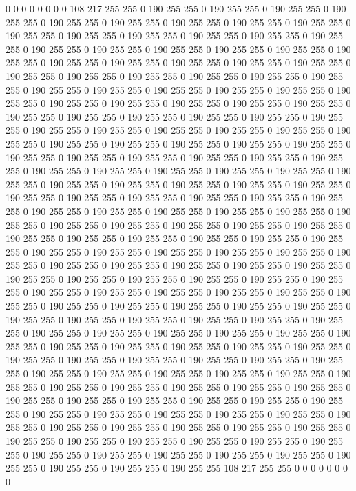 0 0 0 0 0 0 0 0 108 217 255 255 0 190 255 255 0 190 255 255 0 190 255 255 0 190 255 255 0 190 255 255 0 190 255 255 0 190 255 255 0 190 255 255 0 190 255 255 0 190 255 255 0 190 255 255 0 190 255 255 0 190 255 255 0 190 255 255 0 190 255 255 0 190 255 255 0 190 255 255 0 190 255 255 0 190 255 255 0 190 255 255 0 190 255 255 0 190 255 255 0 190 255 255 0 190 255 255 0 190 255 255 0 190 255 255 0 190 255 255 0 190 255 255 0 190 255 255 0 190 255 255 0 190 255 255 0 190 255 255 0 190 255 255 0 190 255 255 0 190 255 255 0 190 255 255 0 190 255 255 0 190 255 255 0 190 255 255 0 190 255 255 0 190 255 255 0 190 255 255 0 190 255 255 0 190 255 255 0 190 255 255 0 190 255 255 0 190 255 255 
0 190 255 255 0 190 255 255 0 190 255 255 0 190 255 255 0 190 255 255 0 190 255 255 0 190 255 255 0 190 255 255 0 190 255 255 0 190 255 255 0 190 255 255 0 190 255 255 0 190 255 255 0 190 255 255 0 190 255 255 0 190 255 255 0 190 255 255 0 190 255 255 0 190 255 255 0 190 255 255 0 190 255 255 0 190 255 255 0 190 255 255 0 190 255 255 0 190 255 255 0 190 255 255 0 190 255 255 0 190 255 255 0 190 255 255 0 190 255 255 0 190 255 255 0 190 255 255 0 190 255 255 0 190 255 255 0 190 255 255 0 190 255 255 0 190 255 255 0 190 255 255 0 190 255 255 0 190 255 255 0 190 255 255 0 190 255 255 0 190 255 255 0 190 255 255 0 190 255 255 0 190 255 255 0 190 255 255 0 190 255 255 0 190 255 255 0 190 255 255 
0 190 255 255 0 190 255 255 0 190 255 255 0 190 255 255 0 190 255 255 0 190 255 255 0 190 255 255 0 190 255 255 0 190 255 255 0 190 255 255 0 190 255 255 0 190 255 255 0 190 255 255 0 190 255 255 0 190 255 255 0 190 255 255 0 190 255 255 0 190 255 255 0 190 255 255 0 190 255 255 0 190 255 255 0 190 255 255 0 190 255 255 0 190 255 255 0 190 255 255 0 190 255 255 0 190 255 255 0 190 255 255 0 190 255 255 0 190 255 255 0 190 255 255 0 190 255 255 0 190 255 255 0 190 255 255 0 190 255 255 0 190 255 255 0 190 255 255 0 190 255 255 0 190 255 255 0 190 255 255 0 190 255 255 0 190 255 255 0 190 255 255 0 190 255 255 0 190 255 255 0 190 255 255 0 190 255 255 0 190 255 255 0 190 255 255 0 190 255 255 
0 190 255 255 0 190 255 255 0 190 255 255 0 190 255 255 0 190 255 255 0 190 255 255 0 190 255 255 0 190 255 255 0 190 255 255 0 190 255 255 0 190 255 255 0 190 255 255 0 190 255 255 0 190 255 255 0 190 255 255 0 190 255 255 0 190 255 255 0 190 255 255 0 190 255 255 0 190 255 255 0 190 255 255 0 190 255 255 0 190 255 255 0 190 255 255 0 190 255 255 0 190 255 255 0 190 255 255 0 190 255 255 0 190 255 255 0 190 255 255 0 190 255 255 0 190 255 255 0 190 255 255 0 190 255 255 0 190 255 255 0 190 255 255 0 190 255 255 0 190 255 255 0 190 255 255 0 190 255 255 0 190 255 255 0 190 255 255 0 190 255 255 0 190 255 255 0 190 255 255 0 190 255 255 0 190 255 255 108 217 255 255 0 0 0 0 0 0 0 0 
